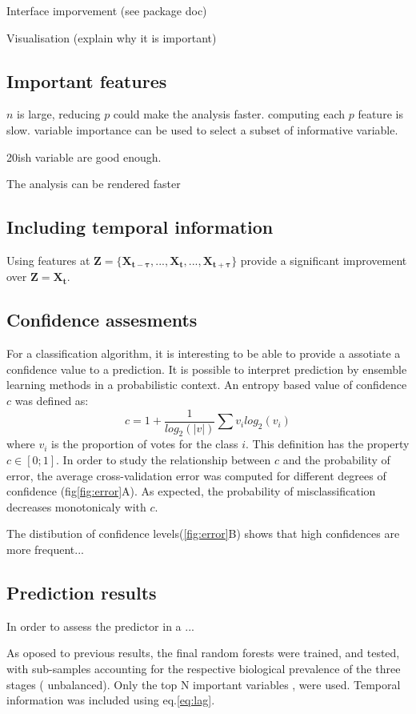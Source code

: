 


Interface imporvement (see package doc)

Visualisation (explain why it is important)


\subsection{Important features}
$n$ is large, reducing $p$ could make the analysis faster. computing each $p$ feature is slow.
variable importance can be used to select a subset of informative variable.

20ish variable are good enough.

The analysis can be rendered faster
\subsection{Including temporal information}
Using features at $\mathbf{Z} = \{\mathbf{X_{t-\tau}}, ..., \mathbf{X_{t}}, ..., \mathbf{X_{t+\tau}}\}$ provide a significant improvement over $\mathbf{Z} = \mathbf{X_{t}}$.


\subsection{Confidence assesments}
For a classification algorithm, it is interesting to be able to provide a assotiate a confidence value to a prediction.
It is possible to interpret prediction by ensemble learning methods in a probabilistic context.
An entropy based value of confidence $c$ was defined as:
\begin{equation}
c = 1 + \frac{1}{log_2(|v|)}\sum{v_i  log_2(v_i)}
\end{equation}
where $v_i$ is the proportion of votes for the class $i$.
This definition has the property $c \in [0;1]$.
In order to study the relationship between $c$ and the probability of error,
the average cross-validation error was computed for different degrees of confidence (fig\ref{fig:error}A).
As expected, the probability of misclassification decreases monotonicaly with $c$.

The distibution of confidence levels(\ref{fig:error}B) shows that high confidences are more frequent... 

\subsection{Prediction results}

In order to assess the predictor in a ...

As oposed to previous results, the final random forests were trained, and tested, with sub-samples accounting for the respective biological prevalence of the three stages (\ie{} unbalanced).
Only the top N\TODO{} important variables , were used. Temporal information was included using eq.\ref{eq:lag}.




